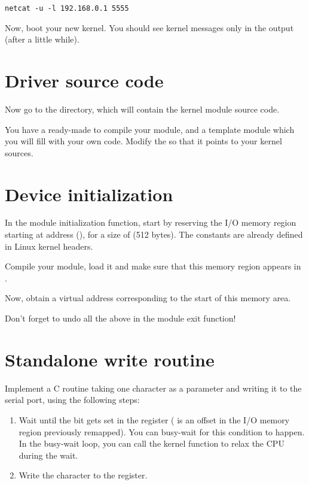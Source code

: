 \begin{verbatim}
netcat -u -l 192.168.0.1 5555
\end{verbatim}

Now, boot your new kernel. You should see kernel messages only in the
 output (after a little while).

\section{Driver source code}

Now go to the  directory, which will contain the
kernel module source code.

You have a ready-made  to compile your module, and a
template  module which you will fill with your own
code. Modify the  so that it points to your kernel sources.

\section{Device initialization}

In the module initialization function, start by reserving the I/O
memory region starting at address (), for a
size of  (512 bytes). The  constants are already defined
in Linux kernel headers.

Compile your module, load it and make sure that this memory region
appears in .

Now, obtain a virtual address corresponding to the start of this
memory area.

Don't forget to undo all the above in the module exit function!

\section{Standalone write routine}

Implement a C routine taking one character as a parameter and writing
it to the serial port, using the following steps:

\begin{enumerate}

 \item Wait until the  bit gets set in
 the  register ( is an
 offset in the I/O memory region previously remapped). You can
 busy-wait for this condition to happen. In the busy-wait loop, you
 can call the  kernel function to relax the CPU
 during the wait.

 \item Write the character to the  register.

\end{enumerate}

